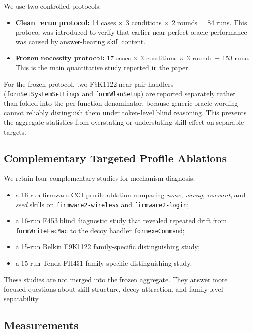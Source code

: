 ﻿\documentclass[preprint,12pt]{elsarticle}
\begin{document}
We use two controlled protocols:
\begin{itemize}[leftmargin=*]
    \item \textbf{Clean rerun protocol:} 14 cases $\times$ 3 conditions
    $\times$ 2 rounds = 84 runs.  This protocol was introduced to verify
    that earlier near-perfect oracle performance was caused by
    answer-bearing skill content.
    \item \textbf{Frozen necessity protocol:} 17 cases $\times$ 3
    conditions $\times$ 3 rounds = 153 runs.  This is the main quantitative
    study reported in the paper.
\end{itemize}

For the frozen protocol, two F9K1122 near-pair handlers
(\texttt{formSetSystemSettings} and \texttt{formWlanSetup}) are reported
separately rather than folded into the per-function denominator, because
generic oracle wording cannot reliably distinguish them under token-level
blind reasoning.  This prevents the aggregate statistics from overstating
or understating skill effect on separable targets.

\subsection{Complementary Targeted Profile Ablations}

We retain four complementary studies for mechanism diagnosis:
\begin{itemize}[leftmargin=*]
    \item a 16-run firmware CGI profile ablation comparing \emph{none},
    \emph{wrong}, \emph{relevant}, and \emph{seed} skills on
    \texttt{firmware2-wireless} and \texttt{firmware2-login};
    \item a 16-run F453 blind diagnostic study that revealed repeated drift
    from \texttt{formWriteFacMac} to the decoy handler
    \texttt{formexeCommand};
    \item a 15-run Belkin F9K1122 family-specific distinguishing study;
    \item a 15-run Tenda FH451 family-specific distinguishing study.
\end{itemize}

These studies are not merged into the frozen aggregate.  They answer more
focused questions about skill structure, decoy attraction, and family-level
separability.

\subsection{Measurements}
\end{document}
